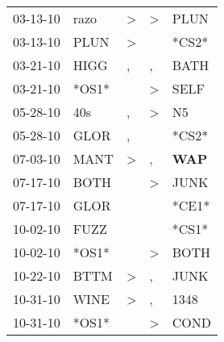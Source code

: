 \begin{supertabular}{p{0.07\textwidth}p{0.06\textwidth}p{0.02\textwidth}p{0.02\textwidth}p{0.06\textwidth}}
          03-13-10\textsuperscript{} &           razo\textsuperscript{} &     \textgreater &     \textgreater &           PLUN\textsuperscript{} \\
          03-13-10\textsuperscript{} &           PLUN\textsuperscript{} &     \textgreater &                  &                            *CS2* \\
          03-21-10\textsuperscript{} &           HIGG\textsuperscript{} &                , &                , &           BATH\textsuperscript{} \\
          03-21-10\textsuperscript{} &                            *OS1* &                  &     \textgreater &           SELF\textsuperscript{} \\
          05-28-10\textsuperscript{} &            40s\textsuperscript{} &                , &     \textgreater &             N5\textsuperscript{} \\
          05-28-10\textsuperscript{} &           GLOR\textsuperscript{} &                , &                  &                            *CS2* \\
          07-03-10\textsuperscript{} &           MANT\textsuperscript{} &     \textgreater &                , &   \textbf{WAP\textsuperscript{}} \\
          07-17-10\textsuperscript{} &           BOTH\textsuperscript{} &                  &     \textgreater &           JUNK\textsuperscript{} \\
          07-17-10\textsuperscript{} &           GLOR\textsuperscript{} &                  &                  &                            *CE1* \\
          10-02-10\textsuperscript{} &           FUZZ\textsuperscript{} &                  &                  &                            *CS1* \\
          10-02-10\textsuperscript{} &                            *OS1* &                  &     \textgreater &           BOTH\textsuperscript{} \\
          10-22-10\textsuperscript{} &           BTTM\textsuperscript{} &     \textgreater &                , &           JUNK\textsuperscript{} \\
          10-31-10\textsuperscript{} &           WINE\textsuperscript{} &     \textgreater &                , &           1348\textsuperscript{} \\
          10-31-10\textsuperscript{} &                            *OS1* &                  &     \textgreater &           COND\textsuperscript{} \\

\end{supertabular}
